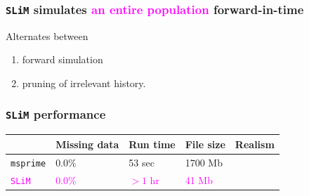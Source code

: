 \documentclass[11pt, mathserif, aspectratio=169]{beamer}
\newcommand{\magenta}[1]{\textcolor{magenta}{#1}}
\newcommand{\crossmark}{\ding{55}}
\begin{document}
\begin{frame}
\frametitle{\texttt{SLiM} simulates \magenta{an entire population} forward-in-time}
\begin{minipage}{.58\textwidth}

\end{minipage}\hfill
\begin{minipage}{.4\textwidth}
Alternates between
\begin{enumerate}
\item forward simulation
\item pruning of irrelevant history.
\end{enumerate}
\end{minipage}
\end{frame}

%

\begin{frame}
\frametitle{\texttt{SLiM} performance}
\begin{center}
\small
\centering
\setlength{\aboverulesep}{5pt}
\setlength{\belowrulesep}{5pt}
\begin{tabularx}{.9\textwidth}{p{2cm}p{2cm}p{1.9cm}p{1.9cm}X}
\toprule
 & Missing data & Run time & File size & Realism \\
\midrule 
\texttt{msprime}& $0.0$\% & 53 sec  &  1700 Mb & \crossmark \\ \addlinespace
\magenta{\texttt{SLiM}} & \magenta{$0.0$\%} & \magenta{$>1$ hr} & \magenta{41 Mb} & \magenta{\checkmark}  \\
\bottomrule
\end{tabularx}
\end{center}
\vspace{5mm}
\end{frame}
\end{document}
